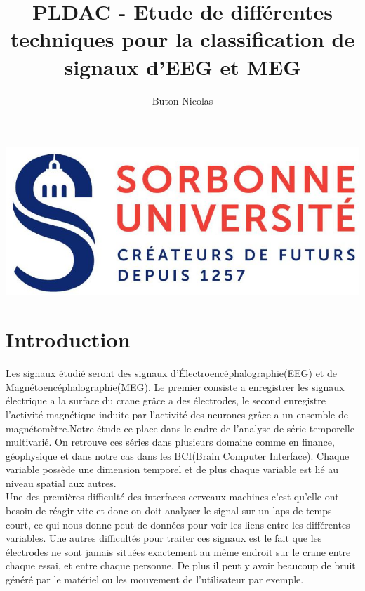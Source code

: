 \documentclass{article}[12pt]
\title{PLDAC - Etude de différentes techniques pour la classification de signaux d'EEG et MEG}
\author{Buton Nicolas}
\begin{document}
\maketitle
\begin{center}
\includegraphics[scale=1]{images/logoSorbonne.jpg}
\end{center}
\newpage
\tableofcontents
\newpage
{}
\part{Introduction}
Les signaux étudié seront des signaux d'Électroencéphalographie(EEG) et de Magnétoencéphalographie(MEG). Le premier consiste a enregistrer les signaux électrique a la surface du crane grâce a des électrodes, le second enregistre l'activité magnétique induite par l'activité des neurones grâce a un ensemble de magnétomètre.Notre étude ce place dans le cadre de l'analyse de série temporelle multivarié. On retrouve ces séries dans plusieurs domaine comme en finance, géophysique et dans notre cas dans les BCI(Brain Computer Interface). Chaque variable possède une dimension temporel et de plus chaque variable est lié au niveau spatial aux autres.\\

Une des premières difficulté des interfaces cerveaux machines c'est qu'elle ont besoin de réagir vite et donc on doit analyser le signal sur un laps de temps court, ce qui nous donne peut de données pour voir les liens entre les différentes variables. Une autres difficultés pour traiter ces signaux est le fait que les électrodes ne sont jamais situées exactement au même endroit sur le crane entre chaque essai, et entre chaque personne. De plus il peut y avoir beaucoup de bruit généré par le matériel ou les mouvement de l'utilisateur par exemple.\\
\end{document}
